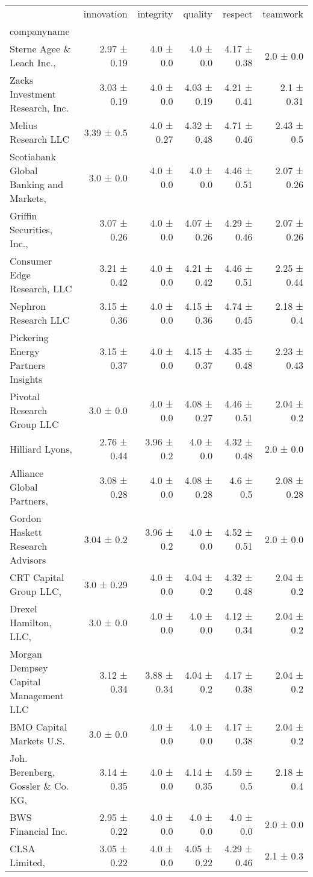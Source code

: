 \begin{tabular}{lrrrrr}
\toprule
 & innovation & integrity & quality & respect & teamwork \\
companyname &  &  &  &  &  \\
\midrule
Sterne Agee \& Leach Inc.,  & 2.97 ± 0.19 & 4.0 ± 0.0 & 4.0 ± 0.0 & 4.17 ± 0.38 & 2.0 ± 0.0 \\
Zacks Investment Research, Inc. & 3.03 ± 0.19 & 4.0 ± 0.0 & 4.03 ± 0.19 & 4.21 ± 0.41 & 2.1 ± 0.31 \\
Melius Research LLC & 3.39 ± 0.5 & 4.0 ± 0.27 & 4.32 ± 0.48 & 4.71 ± 0.46 & 2.43 ± 0.5 \\
Scotiabank Global Banking and Markets,  & 3.0 ± 0.0 & 4.0 ± 0.0 & 4.0 ± 0.0 & 4.46 ± 0.51 & 2.07 ± 0.26 \\
Griffin Securities, Inc.,  & 3.07 ± 0.26 & 4.0 ± 0.0 & 4.07 ± 0.26 & 4.29 ± 0.46 & 2.07 ± 0.26 \\
Consumer Edge Research, LLC & 3.21 ± 0.42 & 4.0 ± 0.0 & 4.21 ± 0.42 & 4.46 ± 0.51 & 2.25 ± 0.44 \\
Nephron Research LLC & 3.15 ± 0.36 & 4.0 ± 0.0 & 4.15 ± 0.36 & 4.74 ± 0.45 & 2.18 ± 0.4 \\
Pickering Energy Partners Insights & 3.15 ± 0.37 & 4.0 ± 0.0 & 4.15 ± 0.37 & 4.35 ± 0.48 & 2.23 ± 0.43 \\
Pivotal Research Group LLC & 3.0 ± 0.0 & 4.0 ± 0.0 & 4.08 ± 0.27 & 4.46 ± 0.51 & 2.04 ± 0.2 \\
Hilliard Lyons,  & 2.76 ± 0.44 & 3.96 ± 0.2 & 4.0 ± 0.0 & 4.32 ± 0.48 & 2.0 ± 0.0 \\
Alliance Global Partners,  & 3.08 ± 0.28 & 4.0 ± 0.0 & 4.08 ± 0.28 & 4.6 ± 0.5 & 2.08 ± 0.28 \\
Gordon Haskett Research Advisors & 3.04 ± 0.2 & 3.96 ± 0.2 & 4.0 ± 0.0 & 4.52 ± 0.51 & 2.0 ± 0.0 \\
CRT Capital Group LLC,  & 3.0 ± 0.29 & 4.0 ± 0.0 & 4.04 ± 0.2 & 4.32 ± 0.48 & 2.04 ± 0.2 \\
Drexel Hamilton, LLC,  & 3.0 ± 0.0 & 4.0 ± 0.0 & 4.0 ± 0.0 & 4.12 ± 0.34 & 2.04 ± 0.2 \\
Morgan Dempsey Capital Management LLC & 3.12 ± 0.34 & 3.88 ± 0.34 & 4.04 ± 0.2 & 4.17 ± 0.38 & 2.04 ± 0.2 \\
BMO Capital Markets U.S. & 3.0 ± 0.0 & 4.0 ± 0.0 & 4.0 ± 0.0 & 4.17 ± 0.38 & 2.04 ± 0.2 \\
Joh. Berenberg, Gossler \& Co. KG,  & 3.14 ± 0.35 & 4.0 ± 0.0 & 4.14 ± 0.35 & 4.59 ± 0.5 & 2.18 ± 0.4 \\
BWS Financial Inc. & 2.95 ± 0.22 & 4.0 ± 0.0 & 4.0 ± 0.0 & 4.0 ± 0.0 & 2.0 ± 0.0 \\
CLSA Limited,  & 3.05 ± 0.22 & 4.0 ± 0.0 & 4.05 ± 0.22 & 4.29 ± 0.46 & 2.1 ± 0.3 \\
\bottomrule
\end{tabular}
